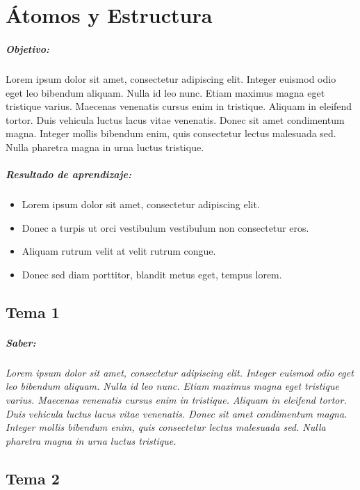 \chapter{Átomos y Estructura}
\paragraph{Objetivo:}
Lorem ipsum dolor sit amet, consectetur adipiscing elit. Integer euismod odio eget leo bibendum aliquam. Nulla id leo nunc. Etiam maximus magna eget tristique varius. Maecenas venenatis cursus enim in tristique. Aliquam in eleifend tortor. Duis vehicula luctus lacus vitae venenatis. Donec sit amet condimentum magna. Integer mollis bibendum enim, quis consectetur lectus malesuada sed. Nulla pharetra magna in urna luctus tristique.

\paragraph{Resultado de aprendizaje: }

\begin{itemize}
	\item Lorem ipsum dolor sit amet, consectetur adipiscing elit.
	\item Donec a turpis ut orci vestibulum vestibulum non consectetur eros.
	\item Aliquam rutrum velit at velit rutrum congue.
	\item Donec sed diam porttitor, blandit metus eget, tempus lorem.
\end{itemize}


\section{Tema 1}
\paragraph{Saber: }
\textit{
	Lorem ipsum dolor sit amet, consectetur adipiscing elit. Integer euismod odio eget leo bibendum aliquam. Nulla id leo nunc. Etiam maximus magna eget tristique varius. Maecenas venenatis cursus enim in tristique. Aliquam in eleifend tortor. Duis vehicula luctus lacus vitae venenatis. Donec sit amet condimentum magna. Integer mollis bibendum enim, quis consectetur lectus malesuada sed. Nulla pharetra magna in urna luctus tristique.
}

\section{Tema 2}
